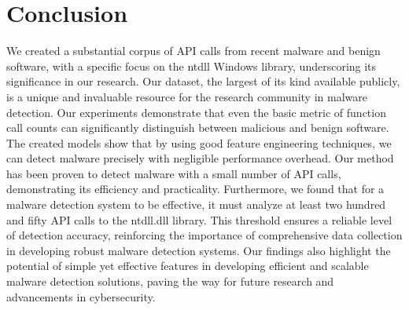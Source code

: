 \section{Conclusion}
\label{sec:conclusion}
\iffalse
We created a large corpora of API calls from very recent malware and benign software based on the ntdll Windows library.
Our experiments show that having simply the function call count itself can help us differentiate between malware and benign software to a great degree.
The tests we ran could detect malware with a high degree of certainty.
We also show that for a malware detection system to be effective to a certain degree, we need at least one hundred API calls to the ntdll.dll library.
\fi
We created a substantial corpus of API calls from recent malware and benign software, with a specific focus on the ntdll Windows library, underscoring its significance in our research. 
Our dataset, the largest of its kind available publicly, is a unique and invaluable resource for the research community in malware detection. 
Our experiments demonstrate that even the basic metric of function call counts can significantly distinguish between malicious and benign software. 
The created models show that by using good feature engineering techniques, we can detect malware precisely with negligible performance overhead.
Our method has been proven to detect malware with a small number of API calls, demonstrating its efficiency and practicality. 
Furthermore, we found that for a malware detection system to be effective, it must analyze at least two hundred and fifty API calls to the ntdll.dll library. 
This threshold ensures a reliable level of detection accuracy, reinforcing the importance of comprehensive data collection in developing robust malware detection systems. 
Our findings also highlight the potential of simple yet effective features in developing efficient and scalable malware detection solutions, paving the way for future research and advancements in cybersecurity.